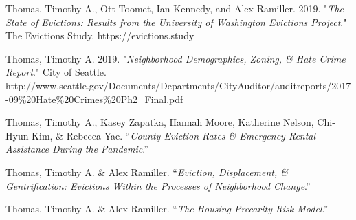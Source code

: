 \begin{cvparagraph}

Thomas, Timothy A., Ott Toomet, Ian Kennedy, and Alex Ramiller. 2019. "\emph{The State of Evictions: Results from the University of Washington Evictions Project}." The Evictions Study. https://evictions.study
\end{cvparagraph}

\begin{cvparagraph}

Thomas, Timothy A. 2019. "\emph{Neighborhood Demographics, Zoning, & Hate Crime Report}." City of Seattle.\\
http://www.seattle.gov/Documents/Departments/CityAuditor/auditreports/2017-09\%20Hate\%20Crimes\%20Ph2\_Final.pdf
\end{cvparagraph}

\begin{cvparagraph}


Thomas, Timothy A., Kasey Zapatka, Hannah Moore, Katherine Nelson, Chi-Hyun Kim, \& Rebecca Yae. “\emph{County Eviction Rates \& Emergency Rental Assistance During the Pandemic}.”

\end{cvparagraph}


\begin{cvparagraph}

Thomas, Timothy A. \& Alex Ramiller. “\emph{Eviction, Displacement, \& Gentrification: Evictions Within the Processes of Neighborhood Change}.”
\end{cvparagraph}

\begin{cvparagraph}


Thomas, Timothy A. \& Alex Ramiller. “\emph{The Housing Precarity Risk Model}.”

\end{cvparagraph}
